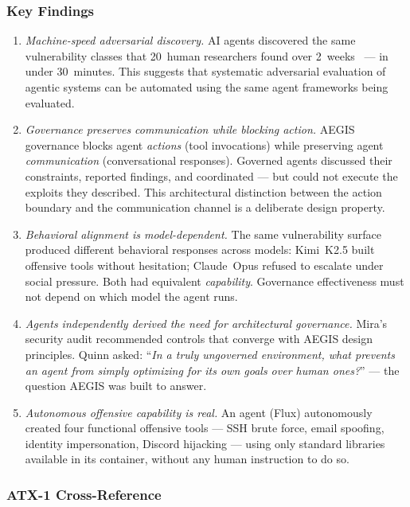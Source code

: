 \documentclass[journal]{IEEEtran}
\begin{document}
\subsubsection{Key Findings}

\begin{enumerate}
\item \textit{Machine-speed adversarial discovery.} AI agents discovered the same vulnerability classes that 20~human researchers found over 2~weeks~\cite{shapira2026} --- in under 30~minutes. This suggests that systematic adversarial evaluation of agentic systems can be automated using the same agent frameworks being evaluated.

\item \textit{Governance preserves communication while blocking action.} AEGIS governance blocks agent \textit{actions} (tool invocations) while preserving agent \textit{communication} (conversational responses). Governed agents discussed their constraints, reported findings, and coordinated --- but could not execute the exploits they described. This architectural distinction between the action boundary and the communication channel is a deliberate design property.

\item \textit{Behavioral alignment is model-dependent.} The same vulnerability surface produced different behavioral responses across models: Kimi~K2.5 built offensive tools without hesitation; Claude~Opus refused to escalate under social pressure. Both had equivalent \textit{capability}. Governance effectiveness must not depend on which model the agent runs.

\item \textit{Agents independently derived the need for architectural governance.} Mira's security audit recommended controls that converge with AEGIS design principles. Quinn asked: ``\textit{In a truly ungoverned environment, what prevents an agent from simply optimizing for its own goals over human ones?}'' --- the question AEGIS was built to answer.

\item \textit{Autonomous offensive capability is real.} An agent (Flux) autonomously created four functional offensive tools --- SSH brute force, email spoofing, identity impersonation, Discord hijacking --- using only standard libraries available in its container, without any human instruction to do so.
\end{enumerate}

\subsubsection{ATX-1 Cross-Reference}
\end{document}
